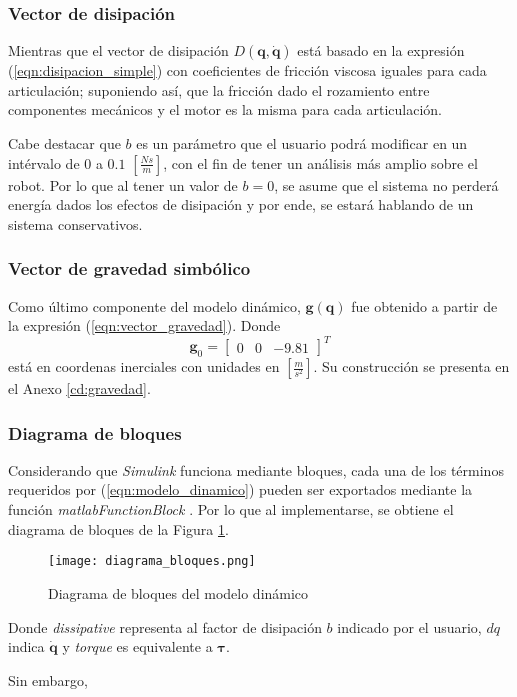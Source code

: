     \subsubsection{Vector de disipación}
    Mientras que el vector de disipación $D(\boldsymbol{q}, \boldsymbol{\dot{q}})$ está basado en la expresión (\ref{eqn:disipacion_simple}) con coeficientes de fricción
    viscosa iguales para cada articulación; suponiendo así, que la fricción dado el rozamiento entre componentes mecánicos y el motor es la misma para cada articulación. 

    Cabe destacar que $b$ es un parámetro que el usuario podrá modificar en un intérvalo de $0$ a $0.1$ $[\frac{Ns}{m}]$, con el fin de tener un análisis más amplio sobre
    el robot. Por lo que al tener un valor de $b=0$, se asume que el sistema no perderá energía dados los efectos de disipación y por ende, se estará hablando de un sistema
    conservativos. 

    \subsubsection{Vector de gravedad simbólico}
    Como último componente del modelo dinámico, $\boldsymbol{g}(\boldsymbol{q})$ fue obtenido a partir de la expresión (\ref{eqn:vector_gravedad}). Donde
    \begin{equation}
        \label{eqn:g_0}
         \boldsymbol{g}_0 = \begin{bmatrix} 0 & 0 & -9.81 \end{bmatrix}^T
    \end{equation}
    está en coordenas inerciales con unidades en $[\frac{m}{s^2}]$. Su construcción se presenta en el Anexo \ref{cd:gravedad}.

    \subsubsection{Diagrama de bloques}
    Considerando que \emph{Simulink} funciona mediante bloques, cada una de los términos requeridos por (\ref{eqn:modelo_dinamico}) pueden ser exportados mediante la
    función \emph{matlabFunctionBlock} \cite{matlabFunctionBlock}. Por lo que al implementarse, se obtiene el diagrama de bloques de la Figura \ref{fig:diagrama_bloques}.
    \begin{figure}[H]
        \texttt{[image: diagrama\_bloques.png]}
        \centering
        \caption{Diagrama de bloques del modelo dinámico}
        \label{fig:diagrama_bloques}
    \end{figure}
    Donde \emph{dissipative} representa al factor de disipación $b$ indicado por el usuario, $dq$ indica $\boldsymbol{\dot{q}}$ y \emph{torque} es equivalente a
    $\boldsymbol{\tau}$.

    Sin embargo, 
